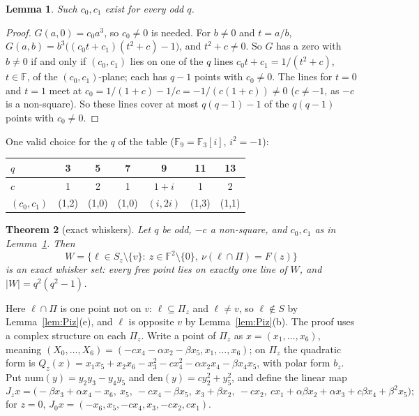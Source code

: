 \documentclass[11pt]{amsart}
\newtheorem{theorem}{Theorem}[section]
\newtheorem{lemma}[theorem]{Lemma}
\theoremstyle{definition}
\theoremstyle{remark}
\numberwithin{equation}{section}
\newcommand{\F}{\mathbb F}
\begin{document}
\begin{lemma}\label{lem:cubic}
Such $c_0,c_1$ exist for every odd $q$.
\end{lemma}

\begin{proof}
$G(a,0)=c_0a^3$, so $c_0\ne0$ is needed. For $b\ne0$ and $t=a/b$, $G(a,b)=b^3\bigl((c_0t+c_1)(t^2+c)-1\bigr)$, and
$t^2+c\ne0$. So $G$ has a zero with $b\ne0$ if and only if $(c_0,c_1)$ lies on one of the $q$ lines $c_0t+c_1=1/(t^2+c)$,
$t\in\F$, of the $(c_0,c_1)$-plane; each has $q-1$ points with $c_0\ne0$. The lines for $t=0$ and $t=1$ meet at
$c_0=1/(1+c)-1/c=-1/(c(1+c))\ne0$ ($c\ne-1$, as $-c$ is a non-square). So these lines cover at most $q(q-1)-1$ of the
$q(q-1)$ points with $c_0\ne0$.
\end{proof}

One valid choice for the $q$ of the table ($\F_9=\F_3[i]$, $i^2=-1$):
\begin{center}
\begin{tabular}{@{}l cccccc@{}}
\toprule $q$ & 3 & 5 & 7 & 9 & 11 & 13\\ \midrule
$c$ & 1 & 2 & 1 & $1+i$ & 1 & 2\\
$(c_0,c_1)$ & (1,2) & (1,0) & (1,0) & $(i,2i)$ & (1,3) & (1,1)\\ \bottomrule
\end{tabular}
\end{center}

\begin{theorem}[exact whiskers]\label{thm:whiskers}
Let $q$ be odd, $-c$ a non-square, and $c_0,c_1$ as in Lemma~\ref{lem:cubic}. Then
\[
W=\bigl\{\ell\in S_z\setminus\{v\}:\ z\in\F^2\setminus\{0\},\ \nu(\ell\cap\Pi)=F(z)\bigr\}
\]
is an exact whisker set: every free point lies on exactly one line of $W$, and $|W|=q^2(q^2-1)$.
\end{theorem}

Here $\ell\cap\Pi$ is one point not on $v$: $\ell\subseteq\Pi_z$ and $\ell\ne v$, so $\ell\notin S$ by
Lemma~\ref{lem:Piz}(e), and $\ell$ is opposite $v$ by Lemma~\ref{lem:Piz}(b). The proof uses a complex structure on each
$\Pi_z$. Write a point of $\Pi_z$ as $x=(x_1,\dots,x_6)$, meaning
$(X_0,\dots,X_6)=(-cx_4-\alpha x_2-\beta x_5,x_1,\dots,x_6)$; on $\Pi_z$ the quadratic form is
$Q_z(x)=x_1x_5+x_2x_6-x_3^2-cx_4^2-\alpha x_2x_4-\beta x_4x_5$, with polar form $b_z$. Put
$\mathrm{num}(y)=y_2y_3-y_4y_5$ and $\mathrm{den}(y)=cy_2^2+y_5^2$, and define the linear map
\[
J_zx=\bigl(-\beta x_3+\alpha x_4-x_6,\ x_5,\ -cx_4-\beta x_5,\ x_3+\beta x_2,\ -cx_2,\
cx_1+\alpha\beta x_2+\alpha x_3+c\beta x_4+\beta^2x_5\bigr);
\]
for $z=0$, $J_0x=(-x_6,x_5,-cx_4,x_3,-cx_2,cx_1)$.
\end{document}
